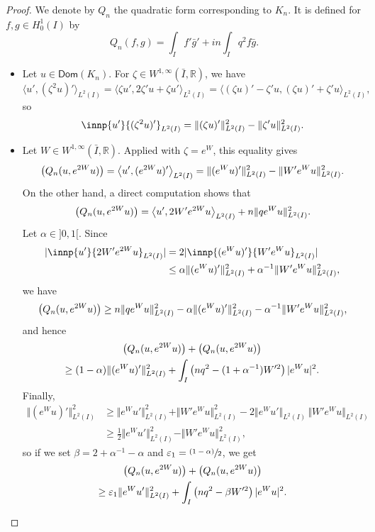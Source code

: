 \documentclass[JEP,XML,SOM,Unicode]{cedram}
\newcommand{\psfrac}[2]{\sfrac{(#1)}{#2}}
\theoremstyle{plain}
\theoremstyle{definition}
\newcommand{\abs}[1]{\vert #1\vert}
\newcommand{\nr}[1]{\Vert #1\Vert}
\newcommand{\binnp}[2]{\bigl\langle #1 , #2 \bigr\rangle}
\newcommand{\inv}{^{-1}}
\newcommand{\1}{\mathds 1}
\let\Re\relax
\DeclareMathOperator{\Re}{\mathsf{Re}\mkern2mu}
\let\Im\relax
\DeclareMathOperator{\Im}{\mathsf{Im}\mkern2mu}
\newcommand{\Dom}{\mathsf{Dom}}
\newcommand{\R}{\mathbb{R}}
\let\a\alpha
\let\e\varepsilon
\let\z\zeta
\begin{document}
\begin{proof}
We denote by $Q_n$ the quadratic form corresponding to $K_n$. It is defined for $f,g \in H_0^1(I)$ by
\[
Q_n(f,g) = \int_I f' \bar g' + i n \int_I q^2 f \bar g.
\]

\begin{itemize}
\item
Let $u \in \Dom(K_n)$. For $\zeta \in W^{1,\infty}(\bar I,\R)$, we have
\[
\binnp{u'}{(\zeta^2 u)'}_{L^2(I)} = \binnp{\z u'}{2\z'u + \z u'}_{L^2(I)} = \binnp{(\zeta u)' - \zeta' u}{(\zeta u)' + \zeta' u}_{L^2(I)},
\]
so
\begin{equation*}
\Re \innp{u'}{(\zeta^2 u)'}_{L^2(I)} = \nr{(\zeta u)'}^2_{L^2(I)} - \nr{\zeta' u}^2_{L^2(I)}.
\end{equation*}

\item
Let $W \in W^{1,\infty}(\bar I,\R)$. Applied with $\zeta = e^{W}$, this equality gives
\begin{equation*}
\Re \bigl(Q_n (u,e^{2W}u) \bigr) = \Re \binnp{u'}{(e^{2W} u)'}_{L^2(I)} = \nr{(e^{W}u)'}^2_{L^2(I)} - \nr{W' e^W u}^2_{L^2(I)}.
\end{equation*}
On the other hand, a direct computation shows that
\[
\Im \bigl(Q_n (u,e^{2W}u) \bigr) = \Im \binnp{u'}{2W' e^{2W} u}_{L^2(I)} + n \nr{q e^W u}^2_{L^2(I)}.
\]
Let $\a \in{}]0,1[$. Since
\begin{align*}
\abs{\Im \innp{u'}{2W' e^{2W} u}_{L^2(I)}}
& = 2 \abs{\Im \innp{(e^W u)'}{W' e^{W} u}_{L^2(I)}} \\
& \leq \a \nr{(e^W u)'}^2_{L^2(I)} + \a\inv\nr{W' e^W u}^2_{L^2(I)},
\end{align*}
we have
\[
\Im \bigl(Q_n (u,e^{2W}u) \bigr) \geq n \nr{q e^W u}^2_{L^2(I)} - \a \nr{(e^W u)'}^2_{L^2(I)} - \a\inv\nr{W' e^W u}^2_{L^2(I)},
\]
and hence
\begin{multline*}
\Re \bigl(Q_n (u,e^{2W}u) \bigr) + \Im \bigl(Q_n (u,e^{2W}u) \bigr)\\
\geq (1-\a) \nr{(e^{W}u)'}^2_{L^2(I)} + \int_{I} \left(nq^2 - (1+\a\inv) W'^2 \right) |e^W u|^2 .
\end{multline*}
Finally,
\begin{align*}
\nr{(e^{W}u)'}^2_{L^2(I)}
& \geq \nr{e^W u'}^2_{L^2(I)} + \nr{W' e^W u}^2_{L^2(I)} - 2\nr{e^W u'}_{L^2(I)}\,\nr{W' e^W u}_{L^2(I)}\\
& \geq \frac 12 \nr{e^W u'}^2_{L^2(I)} - \nr{W' e^W u}^2_{L^2(I)},
\end{align*}
so if we set $\beta = 2 + \a\inv - \a$ and $\e_1 = \psfrac {1-\a} 2$, we get
\begin{multline} \label{minor-Re-Im-Q}
\Re \bigl(Q_n (u,e^{2W}u) \bigr) + \Im \bigl(Q_n (u,e^{2W}u) \bigr)\\
\geq \e_1 \nr{e^{W}u'}^2_{L^2(I)} + \int_{I} \left(nq^2 - \beta W'^2 \right) |e^W u|^2 .
\end{multline}


\end{itemize}
\end{proof}
\end{document}
